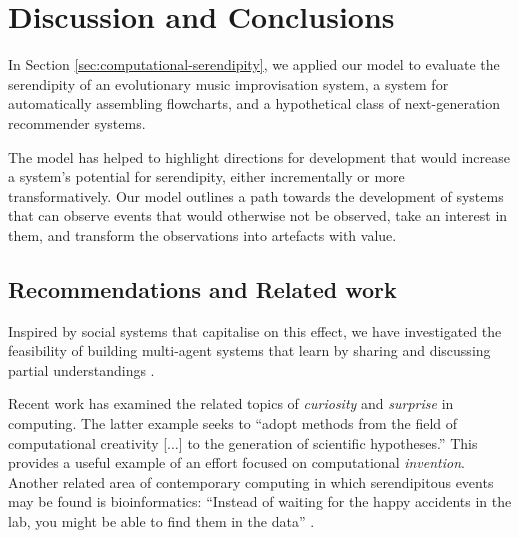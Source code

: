 \section{Discussion and Conclusions} \label{sec:discussion}

In Section \ref{sec:computational-serendipity}, we applied our model to evaluate the serendipity of an evolutionary music improvisation
system, a system for automatically assembling flowcharts, and
a hypothetical class of next-generation recommender systems.

The model has helped to highlight directions for development that
would increase a system's potential for serendipity, either
incrementally or more transformatively.  Our model outlines a path
towards the development of systems that can observe events that would
otherwise not be observed, take an interest in them, and transform the
observations into artefacts with value.


%
%
%

%

\subsection{Recommendations and Related work} \label{sec:related}


Inspired by social systems that capitalise on this effect, we have investigated the feasibility
of building multi-agent systems that learn by sharing and discussing
partial understandings \cite{corneli2015computational,corneli2015feedback}.

 Recent work has examined the related topics of \emph{curiosity}
\cite{wu2013curiosity} and \emph{surprise} \cite{grace2014using} in
computing.  The latter example seeks to ``adopt methods from the field
of computational creativity [$\ldots$] to the generation of scientific
hypotheses.''  This provides a useful example of an effort focused on
computational \emph{invention}.  Another related area of contemporary
computing in which serendipitous events may be found is
bioinformatics: ``Instead of waiting for the happy accidents in the
lab, you might be able to find them in the data''
\cite[p.~70]{kennedy2016inventology}.

